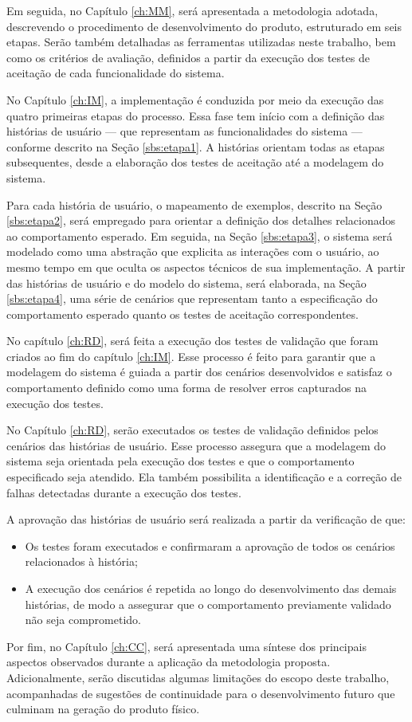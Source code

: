 Em seguida, no Capítulo \ref{ch:MM}, será apresentada a metodologia adotada, descrevendo o procedimento de desenvolvimento do produto, estruturado em seis etapas. 
Serão também detalhadas as ferramentas utilizadas neste trabalho, bem como os critérios de avaliação, definidos a partir da execução dos testes de aceitação de 
cada funcionalidade do sistema.

No Capítulo \ref{ch:IM}, a implementação é conduzida por meio da execução das quatro primeiras etapas do processo. Essa fase tem início com a definição das histórias 
de usuário — que representam as funcionalidades do sistema — conforme descrito na Seção \ref{sbs:etapa1}. A histórias orientam todas as etapas subsequentes, desde a 
elaboração dos testes de aceitação até a modelagem do sistema.

Para cada história de usuário, o mapeamento de exemplos, descrito na Seção \ref{sbs:etapa2}, será empregado para orientar a definição dos detalhes relacionados 
ao comportamento esperado. Em seguida, na Seção \ref{sbs:etapa3}, o sistema será modelado como uma abstração que explicita as interações com o usuário, ao mesmo 
tempo em que oculta os aspectos técnicos de sua implementação. A partir das histórias de usuário e do modelo do sistema, será elaborada, na Seção \ref{sbs:etapa4}, 
uma série de cenários que representam tanto a especificação do comportamento esperado quanto os testes de aceitação correspondentes.  

No capítulo \ref{ch:RD}, será feita a execução dos testes de validação que foram criados ao fim do capítulo \ref{ch:IM}. Esse processo é feito para garantir 
que a modelagem do sistema é guiada a partir dos cenários desenvolvidos e satisfaz o comportamento definido como uma forma de resolver erros capturados na execução 
dos testes. 

No Capítulo \ref{ch:RD}, serão executados os testes de validação definidos pelos cenários das histórias de usuário. Esse processo assegura que a modelagem do sistema 
seja orientada pela execução dos testes e que o comportamento especificado seja atendido. Ela também possibilita a identificação e a correção de falhas detectadas 
durante a execução dos testes.

A aprovação das histórias de usuário será realizada a partir da verificação de que:

\begin{itemize}
    \item Os testes foram executados e confirmaram a aprovação de todos os cenários relacionados à história;
    \item A execução dos cenários é repetida ao longo do desenvolvimento das demais histórias, de modo a assegurar que o comportamento previamente validado não seja comprometido.
\end{itemize}

Por fim, no Capítulo \ref{ch:CC}, será apresentada uma síntese dos principais aspectos observados durante a aplicação da metodologia proposta. Adicionalmente, serão 
discutidas algumas limitações do escopo deste trabalho, acompanhadas de sugestões de continuidade para o desenvolvimento futuro que culminam na geração do produto físico.
